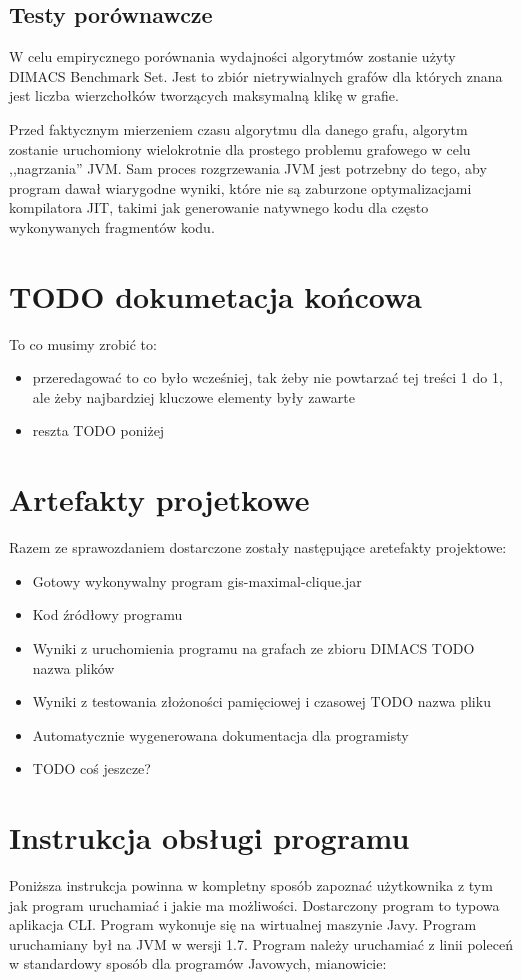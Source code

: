 \documentclass[12pt, a4paper]{article}
\begin{document}
\subsection{Testy porównawcze}
W celu empirycznego porównania wydajności algorytmów zostanie użyty DIMACS Benchmark Set\citep{dimacs}. Jest to zbiór nietrywialnych grafów dla których znana jest liczba wierzchołków tworzących maksymalną klikę w grafie.

Przed faktycznym mierzeniem czasu algorytmu dla danego grafu, algorytm zostanie uruchomiony wielokrotnie dla prostego problemu grafowego w celu ,,nagrzania'' JVM. Sam proces rozgrzewania JVM jest potrzebny do tego, aby program dawał wiarygodne wyniki, które nie są zaburzone optymalizacjami kompilatora JIT, takimi jak generowanie natywnego kodu dla często wykonywanych fragmentów kodu.

\section{TODO dokumetacja końcowa}
To co musimy zrobić to:
\begin{itemize}
\item przeredagować to co było wcześniej, tak żeby nie powtarzać tej treści 1 do 1, ale żeby najbardziej kluczowe elementy były zawarte
\item reszta TODO poniżej
\end{itemize}

\section{Artefakty projetkowe}
Razem ze sprawozdaniem dostarczone zostały następujące aretefakty projektowe:
\begin{itemize}
\item Gotowy wykonywalny program gis-maximal-clique.jar
\item Kod źródłowy programu
\item Wyniki z uruchomienia programu na grafach ze zbioru DIMACS TODO nazwa plików
\item Wyniki z testowania złożoności pamięciowej i czasowej TODO nazwa pliku
\item Automatycznie wygenerowana dokumentacja dla programisty
\item TODO coś jeszcze?
\end{itemize}

\section{Instrukcja obsługi programu}
Poniższa instrukcja powinna w kompletny sposób zapoznać użytkownika z tym jak program uruchamiać i jakie ma możliwości. Dostarczony program to typowa aplikacja CLI. Program wykonuje się na wirtualnej maszynie Javy. Program uruchamiany był na JVM w wersji 1.7. Program należy uruchamiać z linii poleceń w standardowy sposób dla programów Javowych, mianowicie:
\end{document}
